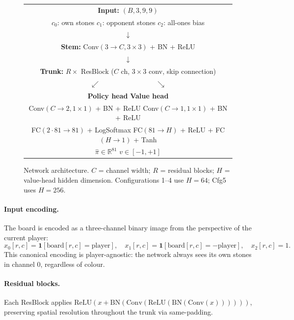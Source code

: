 \documentclass[11pt,a4paper]{article}
\begin{document}
\begin{figure}[h]
\centering
\begin{tabular}{c}
\textbf{Input:} $(B, 3, 9, 9)$ \\[2pt]
$c_0$: own stones \quad $c_1$: opponent stones \quad $c_2$: all-ones bias \\[6pt]
$\downarrow$ \\[2pt]
\textbf{Stem:} Conv$(3\to C, 3\times3)$ + BN + ReLU \\[6pt]
$\downarrow$ \\[2pt]
\textbf{Trunk:} $R\times$ ResBlock ($C$ ch, $3\times3$ conv, skip connection) \\[6pt]
$\swarrow \qquad\qquad\qquad\qquad\searrow$ \\[4pt]
\textbf{Policy head} \quad\quad\quad\quad\quad \textbf{Value head} \\
Conv$(C\to2,1\times1)$ + BN + ReLU \quad\quad Conv$(C\to1,1\times1)$ + BN + ReLU \\
FC$(2\cdot81 \to 81)$ + LogSoftmax \quad\quad FC$(81\to H)$ + ReLU + FC$(H\to1)$ + Tanh \\
$\hat{\pi} \in \mathbb{R}^{81}$ \quad\quad\quad\quad\quad\quad\quad\quad $v \in [-1,+1]$
\end{tabular}
\caption{Network architecture.  $C$ = channel width; $R$ = residual blocks;
$H$ = value-head hidden dimension. Configurations 1--4 use $H=64$; Cfg5 uses $H=256$.}
\label{fig:arch}
\end{figure}

\paragraph{Input encoding.}
The board is encoded as a three-channel binary image from the perspective of the
current player:
\begin{equation}
  x_0[r,c] = \mathbf{1}[\text{board}[r,c] = \text{player}], \quad
  x_1[r,c] = \mathbf{1}[\text{board}[r,c] = -\text{player}], \quad
  x_2[r,c] = 1.
\end{equation}
This canonical encoding is player-agnostic: the network always sees its own
stones in channel 0, regardless of colour.

\paragraph{Residual blocks.}
Each ResBlock applies
$\mathrm{ReLU}(x + \mathrm{BN}(\mathrm{Conv}(\mathrm{ReLU}(\mathrm{BN}(\mathrm{Conv}(x))))))$,
preserving spatial resolution throughout the trunk via same-padding.
\end{document}
